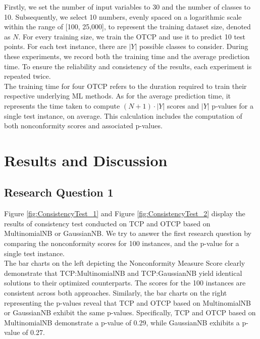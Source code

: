 \documentclass[10pt]{reportMaster}
\begin{document}
\noindent Firstly, we set the number of input variables to 30 and the number of classes to 10. Subsequently, we select 10 numbers, evenly spaced on a logarithmic scale within the range of [100, 25,000], to represent the training dataset size, denoted as $N$. For every training size, we train the OTCP and use it to predict 10 test points. For each test instance, there are $|Y|$ possible classes to consider. During these experiments, we record both the training time and the average prediction time. To ensure the reliability and consistency of the results, each experiment is repeated twice.\\

\noindent The training time for four OTCP refers to the duration required to train their respective underlying ML methods. As for the average prediction time, it represents the time taken to compute $(N+1) \cdot |Y|$ scores and $|Y|$ p-values for a single test instance, on average. This calculation includes the computation of both nonconformity scores and associated p-values.

\section{Results and Discussion}
\subsection{Research Question 1}

Figure \ref{fig:ConsistencyTest_1} and Figure \ref{fig:ConsistencyTest_2} display the results of consistency test conducted on TCP and OTCP based on MultinomialNB or GaussianNB. We try to answer the first research question by comparing the nonconformity scores for 100 instances, and the p-value for a single test instance.\\

\noindent The bar charts on the left depicting the Nonconformity Measure Score clearly demonstrate that TCP:MultinomialNB and TCP:GaussianNB yield identical solutions to their optimized counterparts. The scores for the 100 instances are consistent across both approaches. Similarly, the bar charts on the right representing the p-values reveal that TCP and OTCP based on MultinomialNB or GaussianNB exhibit the same p-values. Specifically, TCP and OTCP based on MultinomialNB demonstrate a p-value of 0.29, while GaussianNB exhibits a p-value of 0.27.
\end{document}

